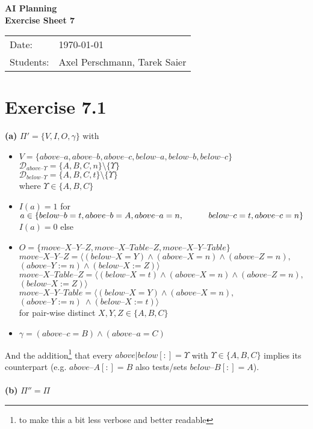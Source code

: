 \documentclass[11pt,a4paper]{article}
\newcommand{\sheetNr}{7}
\newcommand{\h}[0]{\text{--}}
\begin{document}
\begin{center}
\Huge{\textbf{AI Planning}}\\
\LARGE{\textbf{Exercise Sheet \sheetNr}}
\end{center}
\vspace{2cm}
\begin{tabular}{ll}
Date: & \today\\
Students: & Axel Perschmann, Tarek Saier
\end{tabular}

\section*{Exercise 7.1}
\textbf{(a)} $\Pi'=\{V,I,O,\gamma\}$ with\\
\begin{itemize}
\item $V=\{above\h a,above\h b,above\h c,below\h a,below\h b,below\h c\}$\\
$\mathscr{D}_{above\h\Upsilon}=\{A,B,C,n\}\setminus\{\Upsilon\}$\\
$\mathscr{D}_{below\h\Upsilon}=\{A,B,C,t\}\setminus\{\Upsilon\}$\\
where $\Upsilon\in\{A,B,C\}$

\item $I(a)=1$ for $a\in \{below\h b=t,above\h b=A,above\h a=n,\\
\hphantom{wwww}below\h c=t,above\h c=n\}$\\
$I(a)=0$ else

\item $O=\{move\h X\h Y\h Z,move\h X\h Table\h Z,move\h X\h Y\h Table\}$\\
$move\h X\h Y\h Z=\langle (below\h X=Y) \land (above\h X=n) \land (above\h Z=n),$\\
\hphantom{wwww}$(above\h Y:=n) \land (below\h X:=Z) \rangle$\\
$move\h X\h Table\h Z=\langle(below\h X=t) \land (above\h X=n) \land (above\h Z=n),$\\
\hphantom{wwww}$(below\h X:=Z)\rangle$\\
$move\h X\h Y\h Table=\langle(below\h X=Y) \land (above\h X=n),$\\
\hphantom{wwww}$(above\h Y:=n)\ \land (below\h X:=t)\rangle$\\
for pair-wise distinct $X,Y,Z\in\{A,B,C\}$

\item $\gamma=(above\h c=B)\land(above\h a=C)$
\end{itemize}
And the addition\footnote{to make this a bit less verbose and better readable} that every $above|below[:]$$=\Upsilon$ with $\Upsilon\in\{A,B,C\}$ implies its counterpart (e.g. $above\h A[:]$$=B$ also tests/sets $below\h B[:]=A$).\\
\\
\textbf{(b)} $\Pi''=\Pi$\\
\end{document}
